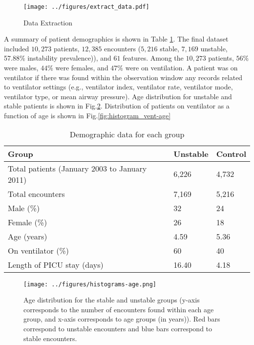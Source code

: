 \documentclass[
   technote
]{phildoc}
\newcommand{\eg}{e.g.,}
\newcommand{\fig}{Fig.}
\newcommand{\tab}{Table}
\begin{document}
\begin{figure}[ht!]
	\centering
	\texttt{[image: ../figures/extract\_data.pdf]}
	\caption{Data Extraction} 
	\label{fig:data_extraction}      
\end{figure} 

   
A summary of patient demographics is shown in \tab{} \ref{tab:demographics}. The final dataset included $10,273$ patients, $12,385$ encounters ($5,216$ stable, $7,169$ unstable, 57.88\% instability prevalence)), and $61$ features. Among the $10,273$ patients, $56\%$ were males, $44\%$ were females, and $47\%$ were on ventilation. A patient was on ventilator if there was found within the observation window any records related to ventilator settings (\eg{} ventilator index, ventilator rate, ventilator mode, ventilator type, or mean airway pressure). Age distribution for unstable and stable patients is shown in \fig{}\ref{fig:histogram_age}. Distribution of patients on ventilator as a function of age is shown in \fig{}\ref{fig:histogram_vent-age}

\begin{table}[h!]
\centering
\caption{Demographic data for each group}
\label{tab:demographics}       
\begin{tabular}{|l|l|l|}
\hline
\textbf{Group} & \textbf{Unstable} & \textbf{Control}\\
\hline
\hline
Total patients (January 2003 to January 2011) & 6,226 & 4,732 \\
\hline
Total encounters	&	7,169	& 	5,216  \\
\hline
Male (\%) 			& 	32		&	24	\\
\hline
Female (\%)			&	26		&	18	 \\
\hline
Age (years)			&	4.59 	&	5.36  \\
\hline
On ventilator (\%)	&	60		&	40 \\
\hline
Length of PICU stay (days)	& 16.40 &	4.18 \\
\hline
\end{tabular}
\end{table}

\begin{figure}[h!]
	\centering
	\texttt{[image: ../figures/histograms-age.png]}
	\caption{Age distribution for the stable and unstable groups (y-axis corresponds to the number of encounters found within each age group, and x-axis corresponds to age groups (in years)). Red bars correspond to unstable encounters and blue bars correspond to stable encounters.} 
	\label{fig:histogram_age}      
\end{figure}
\end{document}
